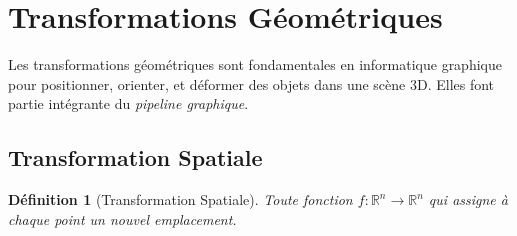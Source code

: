 \documentclass{article}
\newtheorem{definition}{Définition} %
\begin{document}
\section{Transformations Géométriques}

Les transformations géométriques sont fondamentales en informatique graphique pour positionner, orienter, et déformer des objets dans une scène 3D. Elles font partie intégrante du \textit{pipeline graphique}.

\subsection{Transformation Spatiale}

\begin{definition}[Transformation Spatiale]
Toute fonction $f: \mathbb{R}^n \to \mathbb{R}^n$ qui assigne à chaque point un nouvel emplacement.
\end{definition}
\end{document}
